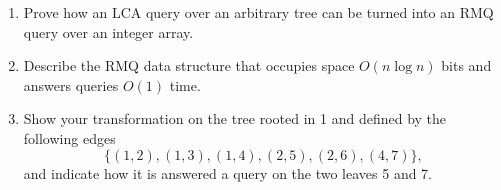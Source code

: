 \exercise
%
\begin{enumerate}

  \item Prove how an LCA query over an arbitrary tree can be turned into an RMQ
  query over an integer array.

  \item Describe the RMQ data structure that occupies space $O(n \log n)$ bits
  and answers queries $O(1)$ time.

  \item Show your transformation on the tree rooted in 1 and defined by the
  following edges $$\{ (1,2), (1,3), (1,4), (2,5), (2,6), (4,7) \},$$ and
  indicate how it is answered a query on the two leaves 5 and 7.

\end{enumerate}

